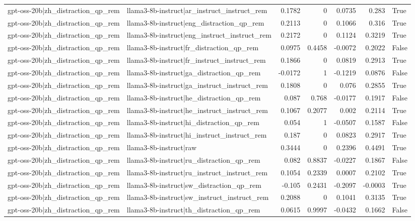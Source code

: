 \begin{table}
\begin{tabular}{l l r r r r l}
gpt-oss-20b|zh_distraction_qp_rem & llama3-8b-instruct|ar_instruct_instruct_rem & 0.1782 & 0 & 0.0735 & 0.283 & True \\
gpt-oss-20b|zh_distraction_qp_rem & llama3-8b-instruct|eng_distraction_qp_rem & 0.2113 & 0 & 0.1066 & 0.316 & True \\
gpt-oss-20b|zh_distraction_qp_rem & llama3-8b-instruct|eng_instruct_instruct_rem & 0.2172 & 0 & 0.1124 & 0.3219 & True \\
gpt-oss-20b|zh_distraction_qp_rem & llama3-8b-instruct|fr_distraction_qp_rem & 0.0975 & 0.4458 & -0.0072 & 0.2022 & False \\
gpt-oss-20b|zh_distraction_qp_rem & llama3-8b-instruct|fr_instruct_instruct_rem & 0.1866 & 0 & 0.0819 & 0.2913 & True \\
gpt-oss-20b|zh_distraction_qp_rem & llama3-8b-instruct|ga_distraction_qp_rem & -0.0172 & 1 & -0.1219 & 0.0876 & False \\
gpt-oss-20b|zh_distraction_qp_rem & llama3-8b-instruct|ga_instruct_instruct_rem & 0.1808 & 0 & 0.076 & 0.2855 & True \\
gpt-oss-20b|zh_distraction_qp_rem & llama3-8b-instruct|he_distraction_qp_rem & 0.087 & 0.768 & -0.0177 & 0.1917 & False \\
gpt-oss-20b|zh_distraction_qp_rem & llama3-8b-instruct|he_instruct_instruct_rem & 0.1067 & 0.2077 & 0.002 & 0.2114 & True \\
gpt-oss-20b|zh_distraction_qp_rem & llama3-8b-instruct|hi_distraction_qp_rem & 0.054 & 1 & -0.0507 & 0.1587 & False \\
gpt-oss-20b|zh_distraction_qp_rem & llama3-8b-instruct|hi_instruct_instruct_rem & 0.187 & 0 & 0.0823 & 0.2917 & True \\
gpt-oss-20b|zh_distraction_qp_rem & llama3-8b-instruct|raw & 0.3444 & 0 & 0.2396 & 0.4491 & True \\
gpt-oss-20b|zh_distraction_qp_rem & llama3-8b-instruct|ru_distraction_qp_rem & 0.082 & 0.8837 & -0.0227 & 0.1867 & False \\
gpt-oss-20b|zh_distraction_qp_rem & llama3-8b-instruct|ru_instruct_instruct_rem & 0.1054 & 0.2339 & 0.0007 & 0.2102 & True \\
gpt-oss-20b|zh_distraction_qp_rem & llama3-8b-instruct|sw_distraction_qp_rem & -0.105 & 0.2431 & -0.2097 & -0.0003 & True \\
gpt-oss-20b|zh_distraction_qp_rem & llama3-8b-instruct|sw_instruct_instruct_rem & 0.2088 & 0 & 0.1041 & 0.3135 & True \\
gpt-oss-20b|zh_distraction_qp_rem & llama3-8b-instruct|th_distraction_qp_rem & 0.0615 & 0.9997 & -0.0432 & 0.1662 & False \\

\end{tabular}
\end{table}
